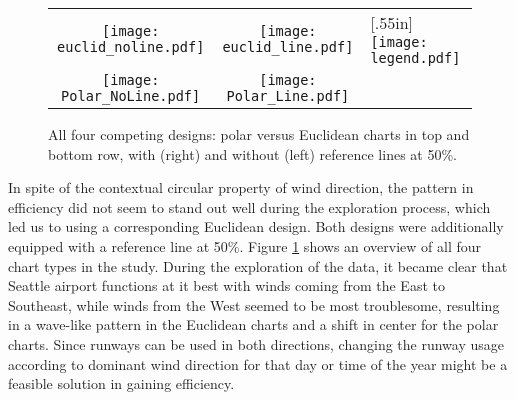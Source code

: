 \begin{figure}[htbp] %
 \hspace{-.1in}
   \begin{tabular}{ccl}
   \texttt{[image: euclid\_noline.pdf]} & \hspace{-.3in}
   \texttt{[image: euclid\_line.pdf]} &  \hspace{-.2in} \multirow{2}{*}[.55in]{  \texttt{[image: legend.pdf]}} \\
   \texttt{[image: Polar\_NoLine.pdf]} &  \hspace{-.3in}
   \texttt{[image: Polar\_Line.pdf]}  
   \end{tabular}
   \caption{All four competing designs: polar versus Euclidean charts in top and bottom row, with (right) and without (left) reference lines at 50\%. }
   \label{layouts}
\end{figure}

In spite of the contextual circular property of wind direction, the pattern in efficiency did not seem to stand out well during the exploration process, which led us to using a corresponding  Euclidean design. Both designs were additionally equipped with a reference line at 50\%. 
Figure \ref{layouts} shows an overview of all four chart types in the study. During the exploration of the data, it became clear that Seattle airport functions at it best with winds coming from the East to Southeast, while winds from the West seemed to be most troublesome, resulting in a wave-like pattern in the Euclidean charts and a shift in center for the polar charts. Since runways can be used in both directions, changing the runway usage according to dominant wind direction for that day or time of the year might be a feasible solution in gaining efficiency. 

